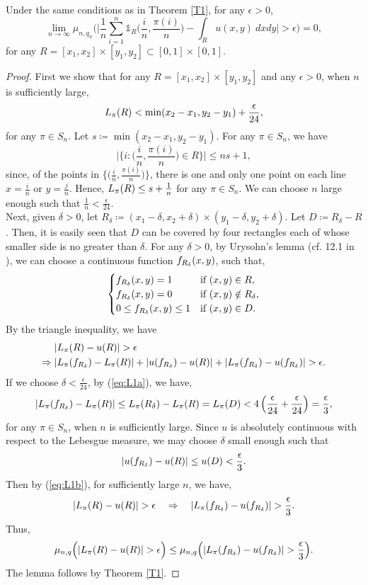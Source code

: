 

\begin{lemma}\label{L1}
Under the same conditions as in Theorem \ref{T1}, for any $\epsilon >0$,
\[
\lim_{n\to \infty} \mu_{n, q_n}
\bigg(\bigg|\frac{1}{n}\sum_{i=1}^{n}\mathds{1}_R\Big(\frac{i}{n}, \frac{\pi(i)}{n}\Big) -
 \int_{R} u(x,y)\ dxdy\bigg|>\epsilon \bigg) = 0,
\]
for any $R = [x_1, x_2]\times[y_1, y_2] \subset [0, 1]\times[0, 1]$.
\end{lemma}
\begin{proof}
First we show that for any $R = [x_1, x_2]\times[y_1, y_2]$ and any $\epsilon >0$, when $n$ is sufficiently large,
\begin{equation}
L_{\pi}(R) < \min(x_2-x_1, y_2-y_1) + \frac{\epsilon}{24},  \label{eq:L1a}
\end{equation}
for any $\pi \in S_n$. Let $s \coloneqq\min(x_2-x_1, y_2-y_1)$. For any $\pi \in S_n$, we have
\[
\Big|\Big\{i : \Big(\frac{i}{n}, \frac{\pi(i)}{n}\Big) \in R \Big\}\Big| \le n s +1,
\]
since, of the points in $\big\{\big(\frac{i}{n}, \frac{\pi(i)}{n}\big)\big\}$, there is one and only one point on each line $x = \frac{i}{n}$ or $y = \frac{j}{n}$. Hence, $L_{\pi}(R) \le s+ \frac{1}{n}$ for any $\pi \in S_n$. We can choose $n$ large enough such that $\frac{1}{n} < \frac{\epsilon}{24}$.\\ 
Next, given $\delta >0$, let $R_{\delta} \coloneqq (x_1-\delta, x_2+\delta)\times(y_1 - \delta, y_2+\delta)$. Let $D \coloneqq R_{\delta}-R$. Then, it is easily seen that $D$ can be covered by four rectangles each of whose smaller side is no greater than $\delta$.
For any $\delta > 0$, by Urysohn's lemma (cf. 12.1 in \cite{Royden}), we can choose a continuous function $f_{R_{\delta}}(x, y)$, such that,
\[
 \begin{cases}
   f_{R_{\delta}}(x, y)= 1 &\text{if } (x, y) \in R,\\
   f_{R_{\delta}}(x, y)= 0 &\text{if } (x, y) \notin R_{\delta},\\
   0 \le f_{R_{\delta}}(x, y) \le 1 &\text{if } (x, y) \in D.
 \end{cases}
\]
By the triangle inequality, we have
\begin{align}
 |&\LL(R) - u(R)|> \epsilon   \label{eq:L1b}\\
 \Rightarrow |&\LL(\ft) - \LL(R)| + |u(\ft) - u(R)| + |\LL(\ft) - u(\ft)| > \epsilon. \nonumber
\end{align}
If we choose $\delta < \frac{\epsilon}{24}$, by (\ref{eq:L1a}), we have,
\[
|L_{\pi}(f_{R_{\delta}}) - L_{\pi}(R)| \le L_{\pi}(R_{\delta}) - L_{\pi}(R) = L_{\pi}(D) < 4 \left(\frac{\epsilon}{24} + \frac{\epsilon}{24}\right) = \frac{\epsilon}{3},
\]
for any $\pi \in S_n$, when $n$ is sufficiently large.
Since $u$ is absolutely continuous with respect to the Lebesgue measure, we may choose $\delta$ small enough such that
\[
|u(f_{R_{\delta}}) - u(R)|\le u(D) < \frac{\epsilon}{3}.
\]
Then by (\ref{eq:L1b}), for sufficiently large $n$,  we have,
\[
|\LL(R) - u(R)|> \epsilon \quad \Rightarrow \quad |\LL(\ft) - u(\ft)| > \frac{\epsilon}{3}.
\]
Thus,
\[
\m\Big(|\LL(R) - u(R)|> \epsilon\Big) \le \m\Big(|\LL(\ft) - u(\ft)| > \frac{\epsilon}{3}\Big).
\]
The lemma follows by Theorem \ref{T1}.
\end{proof}

